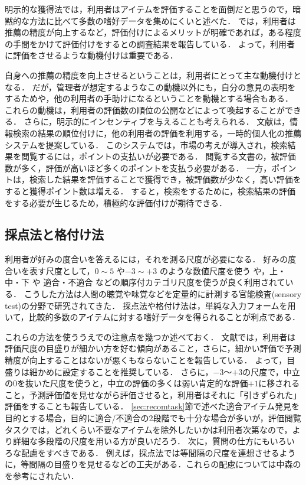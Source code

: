 明示的な獲得法では，利用者はアイテムを評価することを面倒だと思うので，暗黙的な方法に比べて多数の嗜好データを集めにくいと述べた．
\cite{sigir:01:01}では，利用者は推薦の精度が向上するなど，評価付けによるメリットが明確であれば，ある程度の手間をかけて評価付けをするとの調査結果を報告している．
よって，利用者に評価をさせるような動機付けは重要である．

自身への推薦の精度を向上させるということは，利用者にとって主な動機付けとなる．
だが，管理者が想定するようなこの動機以外にも，自分の意見の表明をするためや，他の利用者の手助けになるということを動機とする場合もある\cite{jacm:04:01}．
これらの動機は，利用者の評価数の順位の公開などによって喚起することができる．
さらに，明示的にインセンティブを与えることも考えられる．
文献\cite{ieeem:07:05}は，情報検索の結果の順位付けに，他の利用者の評価を利用する，一時的個人化の推薦システムを提案している．
このシステムでは，市場の考えが導入され，検索結果を閲覧するには，ポイントの支払いが必要である．
閲覧する文書の，被評価数が多く，評価が高いほど多くのポイントを支払う必要がある．
一方，ポイントは，検索した結果を評価することで獲得でき，被評価数が少なく，高い評価をすると獲得ポイント数は増える．
すると，検索をするために，検索結果の評価をする必要が生じるため，積極的な評価付けが期待できる．

\subsection{採点法と格付け法}

利用者が好みの度合いを答えるには，それを測る尺度が必要になる．
好みの度合いを表す尺度として，$0\sim5$ や$-3\sim+3$ のような数値尺度を使う や，上・中・下 や 適合・不適合 などの順序付カテゴリ尺度を使う\cite{jb:015:00}が良く利用されている．
こうした方法は人間の聴覚や味覚などを定量的に計測する官能検査(sensory test)の分野で研究されてきた\cite{jb:016:00}．
採点法や格付け法は，単純な入力フォームを用いて，比較的多数のアイテムに対する嗜好データを得られることが利点である．

これらの方法を使ううえでの注意点を幾つか述べておく．
文献\cite{sigchi:03:02}では，利用者は評価尺度の目盛りが細かい方を好む傾向があること，さらに，細かい評価で予測精度が向上することはないが悪くもならないことを報告している．
よって，目盛りは細かめに設定することを推奨している．
さらに，${-}3$〜${+}3$の尺度で，中立の$0$を抜いた尺度を使うと，中立の評価の多くは弱い肯定的な評価$+1$に移されること，予測評価値を見せながら評価させると，利用者はそれに「引きずられた」評価をすることも報告している．
\ref{sec:recomtask}節で述べた適合アイテム発見を目的とする場合，目的に適合/不適合の2段階でも十分な場合が多いが，評価閲覧タスクでは，どれくらい不要なアイテムを除外したいかは利用者次第なので，より詳細な多段階の尺度を用いる方が良いだろう．
次に，質問の仕方にもいろいろな配慮をすべきである．
例えば，採点法では等間隔の尺度を連想させるように，等間隔の目盛りを見せるなどの工夫がある．これらの配慮については中森の\cite{jb:022:00}を参考にされたい．


